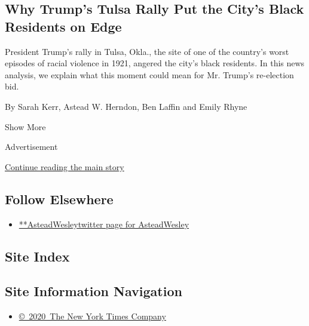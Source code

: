 \begin{enumerate}
{  \subsection{Why Trump's Tulsa Rally Put the City's Black Residents on
  Edge}\label{why-trumps-tulsa-rally-put-the-citys-black-residents-on-edge}}

  President Trump's rally in Tulsa, Okla., the site of one of the
  country's worst episodes of racial violence in 1921, angered the
  city's black residents. In this news analysis, we explain what this
  moment could mean for Mr. Trump's re-election bid.

  By Sarah Kerr, Astead W. Herndon, Ben Laffin and Emily Rhyne
\end{enumerate}

Show More

Advertisement

\protect\hyperlink{after-mid2}{Continue reading the main story}

\hypertarget{follow-elsewhere}{%
\subsection{Follow Elsewhere}\label{follow-elsewhere}}

\begin{itemize}
\tightlist
\item
  \href{https://twitter.com/AsteadWesley}{**AsteadWesleytwitter page for
  AsteadWesley}
\end{itemize}

\hypertarget{site-index}{%
\subsection{Site Index}\label{site-index}}

\hypertarget{site-information-navigation}{%
\subsection{Site Information
Navigation}\label{site-information-navigation}}

\begin{itemize}
\tightlist
\item
  \href{https://help.nytimes3xbfgragh.onion/hc/en-us/articles/115014792127-Copyright-notice}{©~2020~The
  New York Times Company}
\end{itemize}

